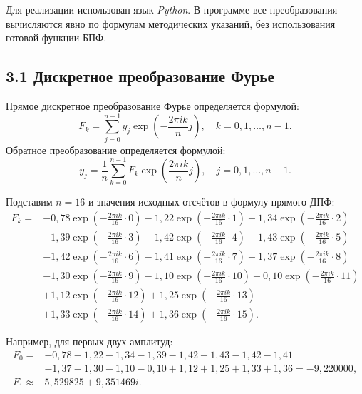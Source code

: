 \documentclass[14pt,a4paper]{extarticle}
\begin{document}
Для реализации использован язык \textit{Python}. В программе все преобразования вычисляются явно по формулам методических указаний, без использования готовой функции БПФ.

\subsection*{3.1 Дискретное преобразование Фурье}
Прямое дискретное преобразование Фурье определяется формулой:
\[
F_k=\sum_{j=0}^{n-1}y_j\exp\left(-\frac{2\pi i k}{n}j\right),
\quad k=0,1,\ldots,n-1.
\]
Обратное преобразование определяется формулой:
\[
y_j=\frac{1}{n}\sum_{k=0}^{n-1}F_k\exp\left(\frac{2\pi i k}{n}j\right),
\quad j=0,1,\ldots,n-1.
\]

Подставим $n=16$ и значения исходных отсчётов в формулу прямого ДПФ:
\begingroup\scriptsize
\begin{align*}
F_k={}&-0{,}78\exp\left(-\frac{2\pi i k}{16}\cdot0\right)
-1{,}22\exp\left(-\frac{2\pi i k}{16}\cdot1\right)
-1{,}34\exp\left(-\frac{2\pi i k}{16}\cdot2\right)\\
&-1{,}39\exp\left(-\frac{2\pi i k}{16}\cdot3\right)
-1{,}42\exp\left(-\frac{2\pi i k}{16}\cdot4\right)
-1{,}43\exp\left(-\frac{2\pi i k}{16}\cdot5\right)\\
&-1{,}42\exp\left(-\frac{2\pi i k}{16}\cdot6\right)
-1{,}41\exp\left(-\frac{2\pi i k}{16}\cdot7\right)
-1{,}37\exp\left(-\frac{2\pi i k}{16}\cdot8\right)\\
&-1{,}30\exp\left(-\frac{2\pi i k}{16}\cdot9\right)
-1{,}10\exp\left(-\frac{2\pi i k}{16}\cdot10\right)
-0{,}10\exp\left(-\frac{2\pi i k}{16}\cdot11\right)\\
&+1{,}12\exp\left(-\frac{2\pi i k}{16}\cdot12\right)
+1{,}25\exp\left(-\frac{2\pi i k}{16}\cdot13\right)\\
&+1{,}33\exp\left(-\frac{2\pi i k}{16}\cdot14\right)
+1{,}36\exp\left(-\frac{2\pi i k}{16}\cdot15\right).
\end{align*}
\endgroup

Например, для первых двух амплитуд:
\begingroup\small
\begin{align*}
F_0={}&-0{,}78-1{,}22-1{,}34-1{,}39-1{,}42-1{,}43-1{,}42-1{,}41\\
&-1{,}37-1{,}30-1{,}10-0{,}10+1{,}12+1{,}25+1{,}33+1{,}36=-9{,}220000,\\
F_1\approx{}&5{,}529825+9{,}351469i.
\end{align*}
\endgroup
\end{document}
